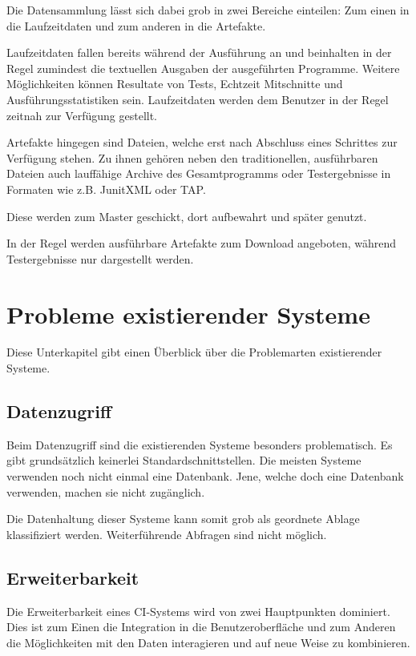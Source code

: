 Die Datensammlung lässt sich dabei grob in zwei Bereiche einteilen:
Zum einen in die Laufzeitdaten und zum anderen in die Artefakte.

Laufzeitdaten fallen bereits w\"ahrend der Ausf\"uhrung an
und beinhalten in der Regel zumindest die textuellen Ausgaben
der ausgef\"uhrten Programme.
Weitere M\"oglichkeiten k\"onnen Resultate von Tests, Echtzeit Mitschnitte und Ausführungsstatistiken sein.
Laufzeitdaten werden dem Benutzer in der Regel zeitnah zur Verfügung gestellt.

Artefakte hingegen sind Dateien,
welche erst nach Abschluss eines Schrittes zur Verfügung stehen.
Zu ihnen geh\"oren neben den traditionellen, ausf\"uhrbaren Dateien
auch lauff\"ahige Archive des Gesamtprogramms oder Testergebnisse in Formaten wie z.B. JunitXML \cite{jenkins:junitxml} oder \ac{TAP}.


Diese werden zum Master geschickt, dort aufbewahrt und sp\"ater genutzt.

In der Regel werden ausf\"uhrbare Artefakte zum Download angeboten,
w\"ahrend Testergebnisse nur dargestellt werden.


\section{Probleme existierender Systeme}

Diese Unterkapitel gibt einen \"Uberblick \"uber die Problemarten existierender Systeme.

\subsection{Datenzugriff}

Beim Datenzugriff sind die existierenden Systeme besonders problematisch.
Es gibt grundsätzlich keinerlei Standardschnittstellen.
Die meisten Systeme verwenden noch nicht einmal eine Datenbank.
Jene, welche doch eine Datenbank verwenden, machen sie nicht zugänglich.

Die Datenhaltung dieser Systeme kann somit grob als geordnete Ablage klassifiziert werden.
Weiterführende Abfragen sind nicht möglich.

\subsection{Erweiterbarkeit}

Die Erweiterbarkeit eines \ac{CI}-Systems wird von zwei Hauptpunkten dominiert.
Dies ist zum Einen die Integration in die Benutzeroberfl\"ache
und zum Anderen die Möglichkeiten mit den Daten interagieren
und auf neue Weise zu kombinieren.

